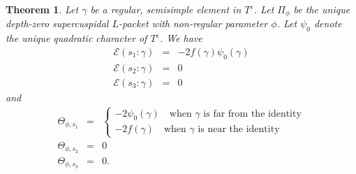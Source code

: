 \documentclass[11pt]{amsart}
\numberwithin{equation}{section}
\newtheorem{thm}[equation]{Theorem}
\def\fe{\mathfrak{e}}
\newcommand{\<}{\left\langle}
\renewcommand{\>}{\right\rangle}
\begin{document}
\begin{thm} \label{B}   Let $\gamma$ be a regular, semisimple element in $T^\varepsilon$.  Let $\Pi_\phi$ be the unique depth-zero supercuspidal $L$-packet with non-regular parameter $\phi$.  
Let $\psi_0$ denote the unique quadratic character of $T^\varepsilon$.   
We have 
\begin{eqnarray*}
\mathscr{E}(s_1 : \gamma) &=&  -2 f(\gamma) \psi_0(\gamma) \\
\mathscr{E}(s_2 : \gamma) &=& 0\\
\mathscr{E}(s_3:\gamma) & = & 0
\end{eqnarray*}
and 
\begin{eqnarray*}
\Theta_{\phi, s_1} &=&
\begin{cases} 
-2\psi_0(\gamma) \quad  \text{when $\gamma$ is far from the identity}\\
 -2f(\gamma)   \quad \text{when $\gamma$ is near the identity} 
\end{cases}\\
\Theta_{\phi, s_2}  &=& 0 \\
\Theta_{\phi, s_3} &=& 0.
\end{eqnarray*}
\end{thm} 



 
\end{document}
